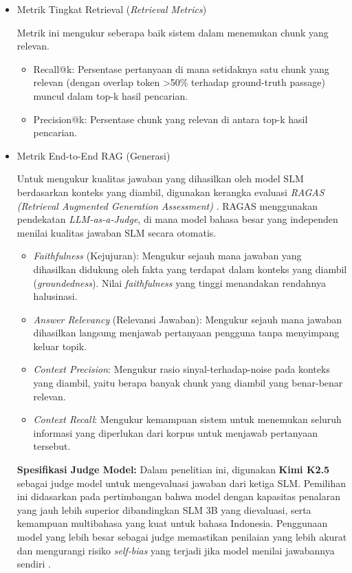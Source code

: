 \begin{itemize}
  \item Metrik Tingkat Retrieval (\textit{Retrieval Metrics}) \par
    Metrik ini mengukur seberapa baik sistem dalam menemukan chunk yang relevan. 
    \begin{itemize}
        \item Recall@k: Persentase pertanyaan di mana setidaknya satu chunk yang relevan (dengan overlap token >50\% terhadap ground-truth passage) muncul dalam top-k hasil pencarian.
        \item Precision@k: Persentase chunk yang relevan di antara top-k hasil pencarian.
    \end{itemize}
     
  \item Metrik End-to-End RAG (Generasi)\par
    Untuk mengukur kualitas jawaban yang dihasilkan oleh model SLM berdasarkan konteks yang diambil, digunakan kerangka evaluasi \textit{RAGAS (Retrieval Augmented Generation Assessment)} \citep{es2025ragasautomatedevaluationretrieval}. RAGAS menggunakan pendekatan \textit{LLM-as-a-Judge}, di mana model bahasa besar yang independen menilai kualitas jawaban SLM secara otomatis.
    \begin{itemize}
        \item \textit{Faithfulness} (Kejujuran): Mengukur sejauh mana jawaban yang dihasilkan didukung oleh fakta yang terdapat dalam konteks yang diambil (\textit{groundedness}). Nilai \textit{faithfulness} yang tinggi menandakan rendahnya halusinasi.
        \item \textit{Answer Relevancy} (Relevansi Jawaban): Mengukur sejauh mana jawaban dihasilkan langsung menjawab pertanyaan pengguna tanpa menyimpang keluar topik.
        \item \textit{Context Precision}: Mengukur rasio sinyal-terhadap-noise pada konteks yang diambil, yaitu berapa banyak chunk yang diambil yang benar-benar relevan.
        \item \textit{Context Recall}: Mengukur kemampuan sistem untuk menemukan seluruh informasi yang diperlukan dari korpus untuk menjawab pertanyaan tersebut.
    \end{itemize}
    
    \textbf{Spesifikasi Judge Model:}
    Dalam penelitian ini, digunakan \textbf{Kimi K2.5} sebagai judge model untuk mengevaluasi jawaban dari ketiga SLM. Pemilihan ini didasarkan pada pertimbangan bahwa model dengan kapasitas penalaran yang jauh lebih superior dibandingkan SLM 3B yang dievaluasi, serta kemampuan multibahasa yang kuat untuk bahasa Indonesia. Penggunaan model yang lebih besar sebagai judge memastikan penilaian yang lebih akurat dan mengurangi risiko \textit{self-bias} yang terjadi jika model menilai jawabannya sendiri \citep{zheng2023judging}.
     

\end{itemize}

